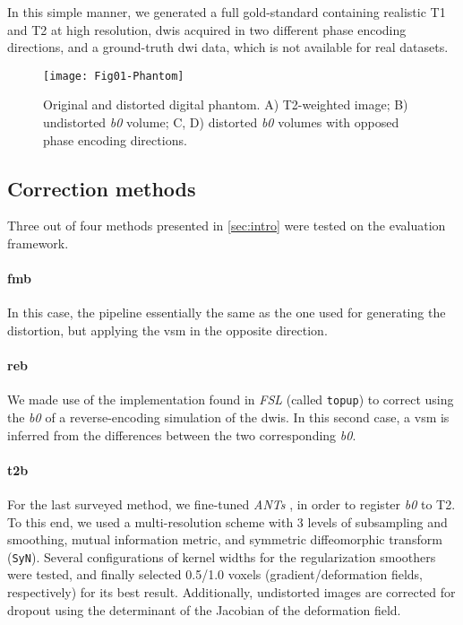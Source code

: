 In this simple manner, we generated a full gold-standard
containing realistic T1 and T2
at high resolution, \glspl*{dwi} acquired in two
different phase encoding directions, and a ground-truth
\gls*{dwi} data, which is not available for real datasets.


\begin{figure}[thpb]
   \centering
   \texttt{[image: Fig01-Phantom]}
   \caption{Original and distorted digital phantom.
   A) T2-weighted image; B) undistorted \textit{b0} volume;
   C, D) distorted \textit{b0} volumes with opposed phase encoding 
   directions.}
   \label{fig:label}
\end{figure}

\subsection{Correction methods}

Three out of four methods presented in \autoref{sec:intro}
were tested on the evaluation framework.

\paragraph*{\Gls*{fmb}} In this case, the pipeline essentially
the same as the one used for generating the distortion, but
applying the \gls*{vsm} in the opposite direction.

\paragraph*{\Gls*{reb}} We made use of the implementation found
in \emph{FSL} (called \texttt{topup}) to correct using the \textit{b0} of a
reverse-encoding simulation of the \glspl*{dwi}. In this second
case, a \gls*{vsm} is inferred from the differences between the 
two corresponding \textit{b0}.

\paragraph*{\Gls*{t2b}} For the last surveyed method,
we fine-tuned \emph{ANTs} \cite{avants_ants:_2013},
in order to register \textit{b0} to T2. To this end, we used a
multi-resolution scheme with 3 levels of subsampling and smoothing,
mutual information metric, and symmetric diffeomorphic transform 
(\texttt{SyN}). Several configurations of kernel widths for the 
regularization smoothers were tested, and finally selected 
0.5/1.0 voxels (gradient/deformation fields, respectively) 
for its best result. Additionally, undistorted images are 
corrected for dropout using the determinant
of the Jacobian of the deformation field.

